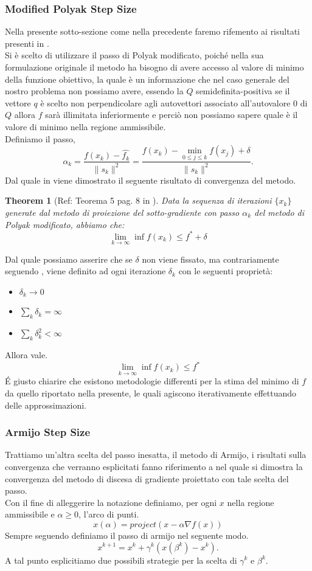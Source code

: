 \documentclass[12pt]{extarticle}
\newtheorem{theorem}{Theorem}[section]
\begin{document}
\subsubsection{Modified Polyak Step Size}
Nella presente sotto-sezione come nella precedente faremo rifemento ai risultati presenti in \cite{sgd_notes}.\\
Si è scelto di utilizzare il passo di Polyak modificato, poiché nella sua formulazione originale il metodo ha bisogno di avere accesso al valore di minimo della funzione obiettivo, la quale è un informazione che nel caso generale del nostro problema non possiamo avere, essendo la $Q$ semidefinita-positiva se il vettore $q$ è scelto non perpendicolare agli autovettori associato all'autovalore 0 di $Q$ allora $f$ sarà illimitata inferiormente e perciò non possiamo sapere quale è il valore di minimo nella regione ammissibile.\\
Definiamo il passo,
\[\alpha_k = \frac{f(x_k) - \hat{f_k}}{\|s_k\|^2} = \frac{f(x_k) - \min_{0 \leq j \leq k} f(x_j) + \delta}{\|s_k\|^2}.\]
Dal quale in \cite{sgd_notes} viene dimostrato il seguente risultato di convergenza del metodo.
\begin{theorem}[Ref: Teorema 5 pag. 8 in \cite{sgd_notes}]
Data la sequenza di iterazioni $\{x_k\}$ generate dal metodo di proiezione del sotto-gradiente con passo $\alpha_k$ del metodo di Polyak modificato, abbiamo che:
\[\lim_{k \to \infty} \inf f(x_k) \leq f^* + \delta\]
\end{theorem}
Dal quale possiamo asserire che se $\delta$ non viene fissato, ma contrariamente seguendo \cite{subgrad_method_slides}, viene definito ad ogni iterazione $\delta_k$ con le seguenti proprietà:\\
\begin{itemize}
    \item $\delta_k \to 0$
    \item $\sum_k \delta_k = \infty$
    \item $\sum_k \delta_k^2 < \infty$
\end{itemize}
Allora vale.
\[\lim_{k \to \infty} \inf f(x_k) \leq f^*\]
\'E giusto chiarire che esistono metodologie differenti per la stima del minimo di $f$ da quello riportato nella presente, le quali agiscono iterativamente effettuando delle approssimazioni.
\subsubsection{Armijo Step Size}
Trattiamo un'altra scelta del passo inesatta, il metodo di Armijo, i risultati sulla convergenza che verranno esplicitati fanno riferimento a \cite{gafni1982convergence} nel quale si dimostra la convergenza del metodo di discesa di gradiente proiettato con tale scelta del passo.\\
Con il fine di alleggerire la notazione definiamo, per ogni $x$ nella regione ammissibile e $\alpha \geq 0$, l'arco di punti.
\[x(\alpha) = project(x - \alpha \nabla f(x))\]
Sempre seguendo \cite{gafni1982convergence} definiamo il passo di armijo nel seguente modo.
\[x^{k+1} = x^k + \gamma^k (x(\beta^k) - x^k).\]
A tal punto esplicitiamo due possibili strategie per la scelta di $\gamma^k$ e $\beta^k$.\\
\end{document}
